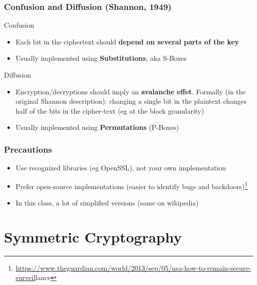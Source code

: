 \documentclass[
hyperref={pdfpagelabels=false}
,xcolor=table
]
{beamer}
\begin{document}
\begin{frame}
  \frametitle{Confusion and Diffusion (Shannon, 1949)}

  \begin{block}{Confusion}
    \begin{itemize}
    \item Each bit in the ciphertext should \textbf{depend on several parts of
      the key}
    \item Usually implemented using \textbf{Substitutions}, aka S-Boxes
    \end{itemize}
  \end{block}


  \begin{block}{Diffusion}
    \begin{itemize}
    \item Encryption/decryptions should imply an \textbf{avalanche effet}. Formally (in the original Shannon description): changing a single bit in the plaintext changes half of the bits in the cipher-text (eg at the block granularity)
    \item Usually implemented using \textbf{Permutations} (P-Boxes)
    \end{itemize}
  \end{block}
  
\end{frame}



\begin{frame}
  \frametitle{Precautions}

  \begin{itemize}
  \item Use recognized libraries (eg OpenSSL), not your own implementation
  \item Prefer open-source implementations (easier to identify bugs and backdoors)\footnote{\url{https://www.theguardian.com/world/2013/sep/05/nsa-how-to-remain-secure-surveil}lance}
  \item In this class, a lot of simplified versions (same on wikipedia)
  \end{itemize}

  
\end{frame}

\section{Symmetric Cryptography}
\end{document}
